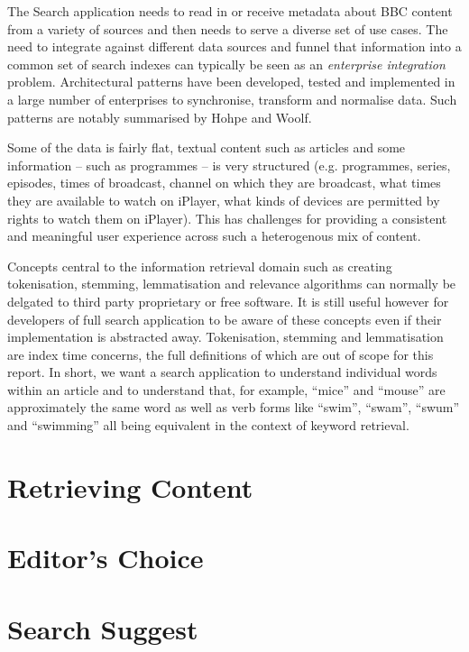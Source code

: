 \documentclass[10pt,a4paper]{report}
\begin{document}
The Search application needs to read in or receive metadata about
BBC content from a variety of sources and then needs to serve
a diverse set of use cases. \cite{fenning2014applicability} The
need to integrate against different data sources and funnel
that information into a common set of search indexes can
typically be seen as an \emph{enterprise integration}
problem. Architectural patterns have been developed, tested and
implemented in a large number of enterprises to synchronise,
transform and normalise data. Such patterns are notably
summarised by Hohpe and Woolf\cite{hohpe2004enterprise}.

Some of the data is fairly flat, textual content such as articles and some
information -- such as programmes -- is very structured (e.g. programmes,
series, episodes, times of broadcast, channel on which they are broadcast,
what times they are available to watch on iPlayer, what kinds of devices
are permitted by rights to watch them on iPlayer). This has challenges
for providing a consistent and meaningful user experience across such
a heterogenous mix of content.

Concepts central to the information retrieval domain such as creating
tokenisation, stemming, lemmatisation and relevance
algorithms can normally be delgated to
third party proprietary or free software. It is still useful however
for developers of full search application to be aware of these concepts even
if their implementation is abstracted away. Tokenisation, stemming and
lemmatisation are index time concerns, the full definitions of which
are out of scope for this report. In short, we want a search application
to understand individual words within an article and to understand that, for
example, ``mice'' and ``mouse'' are approximately the same word as well
as verb forms like ``swim'', ``swam'', ``swum'' and ``swimming'' all being
equivalent in the context of keyword retrieval.

\section{Retrieving Content}


\section{Editor's Choice}

\section{Search Suggest}
\end{document}
